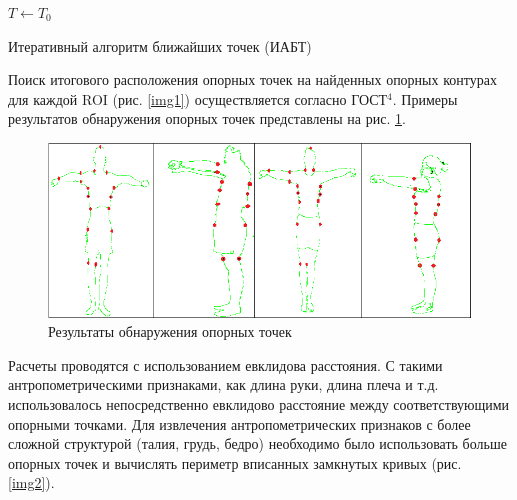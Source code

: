 \begin{algorithm}[ht!]
  $T\leftarrow T_0$\;
  \caption{Итеративный алгоритм ближайших точек (ИАБТ)}
\end{algorithm}

Поиск итогового расположения опорных точек на найденных опорных контурах для каждой ROI (рис. \ref{img1}) осуществляется согласно ГОСТ$^4$. Примеры результатов обнаружения опорных точек представлены на рис. \ref{img7}.
\begin{figure}[ht!]
\centering
\includegraphics [width=0.9\linewidth] {images/h18.png}
\begin{center}
\caption{Результаты обнаружения опорных точек} \label{img7}
\end{center}
\end{figure}
Расчеты  проводятся с использованием евклидова расстояния. С такими антропометрическими признаками, как длина руки, длина плеча и т.д. использовалось непосредственно евклидово расстояние между соответствующими опорными точками. Для извлечения антропометрических признаков с более сложной структурой (талия, грудь, бедро) необходимо было использовать больше опорных точек и вычислять периметр вписанных замкнутых кривых (рис. \ref{img2}).

